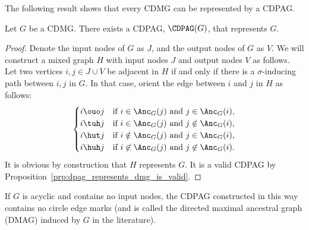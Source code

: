 The following result shows that every CDMG can be represented by a CDPAG.
\begin{Prp}\label{prp:from_dmg_to_dpag}
  Let $G$ be a CDMG. There exists a CDPAG, $\CDPAG(G)$, that represents $G$.
\end{Prp}
\begin{proof}
  Denote the input nodes of $G$ as $J$, and the output nodes of $G$ as $V$.
  We will construct a mixed graph $H$ with input nodes $J$ and output nodes $V$ as follows.
  Let two vertices $i,j \in J\cup V$ be adjacent in $H$ if and only if there is a $\sigma$-inducing path between $i,j$ in $G$.
  In that case, orient the edge between $i$ and $j$ in $H$ as follows:
    $$\begin{cases}
      \text{$i \ouo j$} & \text{if $i \in \Anc_G(j)$ and $j \in \Anc_G(i)$}, \\
      \text{$i \tuh  j$} & \text{if $i \in \Anc_G(j)$ and $j \notin \Anc_G(i)$}, \\
      \text{$i \hut  j$} & \text{if $i \notin \Anc_G(j)$ and $j \in \Anc_G(i)$}, \\
      \text{$i \huh j$} & \text{if $i \not\in \Anc_G(j)$ and $j \not\in \Anc_G(i)$.}
    \end{cases}$$
  It is obvious by construction that $H$ represents $G$.
  It is a valid CDPAG by Proposition~\ref{prp:dpag_represents_dmg_is_valid}.
\end{proof}
If $G$ is acyclic and contains no input nodes, the CDPAG constructed in this way contains no circle edge marks (and is called the directed maximal ancestral graph (DMAG) induced by $G$ in the literature).

